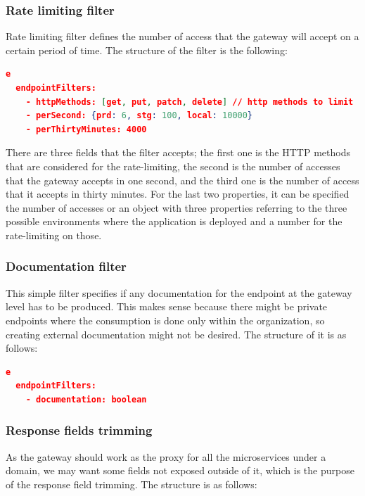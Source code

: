 \documentclass[english, 12pt, a4paper, sci, utf8, a-1b, online]{aaltothesis}
\begin{document}
\subsubsection*{Rate limiting filter}

Rate limiting filter defines the number of access that the gateway will accept on a certain period of time. The structure of the filter is the following: \\

\begin{lstlisting}[language=json,firstnumber=1]e
  endpointFilters:
    - httpMethods: [get, put, patch, delete] // http methods to limit
    - perSecond: {prd: 6, stg: 100, local: 10000}
    - perThirtyMinutes: 4000
\end{lstlisting}

There are three fields that the filter accepts; the first one is the HTTP methods that are considered for the rate-limiting, the second is the number of accesses that the gateway accepts in one second, and the third one is the number of access that it accepts in thirty minutes. For the last two properties, it can be specified the number of accesses or an object with three properties referring to the three possible environments where the application is deployed and a number for the rate-limiting on those.

\subsubsection*{Documentation filter}

This simple filter specifies if any documentation for the endpoint at the gateway level has to be produced. This makes sense because there might be private endpoints where the consumption is done only within the organization, so creating external documentation might not be desired. The structure of it is as follows:\\

\begin{lstlisting}[language=json,firstnumber=1]e
  endpointFilters:
    - documentation: boolean
\end{lstlisting}

\subsubsection*{Response fields trimming}

As the gateway should work as the proxy for all the microservices under a domain, we may want some fields not exposed outside of it, which is the purpose of the response field trimming. The structure is as follows:\\
\end{document}
